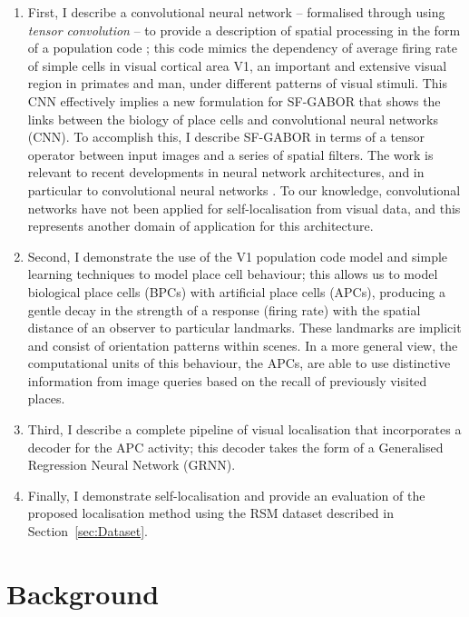\begin{enumerate}

\item First, I describe a convolutional neural network -- formalised through using \textit{tensor convolution} -- to provide a description of spatial processing in the form of a population code \cite{berens2012fast}; this code mimics the dependency of average firing rate of simple cells in visual cortical area V1, an important and extensive visual region in primates and man, under different patterns of visual stimuli. This CNN effectively implies a new formulation for SF-GABOR that shows the links between the biology of place cells and convolutional neural networks (CNN). To accomplish this, I describe SF-GABOR in terms of a tensor operator between input images and a series of spatial filters.  The work is relevant to recent developments in neural network architectures, and in particular to convolutional neural networks \cite{krizhevsky2012imagenet, lecun1995convolutional}.  To our knowledge, convolutional networks have not been applied for self-localisation from visual data, and this represents another domain of application for this architecture.

\item Second, I demonstrate the use of the V1 population code model and simple learning techniques to model place cell behaviour; this allows us to model biological place cells (BPCs) with artificial place cells (APCs), producing a gentle decay in the strength of a response (firing rate) with the spatial distance of an observer to particular landmarks. These landmarks are implicit and consist of orientation patterns within scenes. In a more general view, the computational units of this behaviour, the APCs, are able to use distinctive information from image queries based on the recall of previously visited places. 

\item Third, I describe a complete pipeline of visual localisation that incorporates a decoder for the APC activity; this decoder takes the form of a Generalised Regression Neural Network (GRNN). 

\item Finally, I demonstrate self-localisation and provide an evaluation of the proposed localisation method using the RSM dataset described in Section~\ref{sec:Dataset}.

\end{enumerate}

\section{Background}

